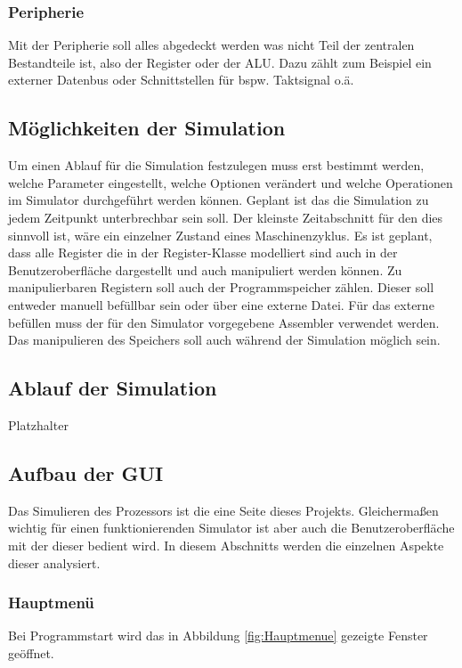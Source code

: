\documentclass[12pt]{article}
\newcommand{\imgSpaceBefore}{\vspace{10pt}}
\begin{document}
\subsubsection{Peripherie}
Mit der Peripherie soll alles abgedeckt werden was nicht Teil der zentralen Bestandteile ist, also der Register oder der ALU. Dazu zählt zum Beispiel ein externer Datenbus oder Schnittstellen für bspw. Taktsignal o.ä.

\subsection{Möglichkeiten der Simulation}
Um einen Ablauf für die Simulation festzulegen muss erst bestimmt werden, welche Parameter eingestellt, welche Optionen verändert und welche Operationen im Simulator durchgeführt werden können. Geplant ist das die Simulation zu jedem Zeitpunkt unterbrechbar sein soll. Der kleinste Zeitabschnitt für den dies sinnvoll ist, wäre ein einzelner Zustand eines Maschinenzyklus. Es ist geplant, dass alle Register die in der Register-Klasse modelliert sind auch in der Benutzeroberfläche dargestellt und auch manipuliert werden können. Zu manipulierbaren Registern soll auch der Programmspeicher zählen. Dieser soll entweder manuell befüllbar sein oder über eine externe Datei. Für das externe befüllen muss der für den Simulator vorgegebene Assembler verwendet werden. Das manipulieren des Speichers soll auch während der Simulation möglich sein.

\subsection{Ablauf der Simulation}
Platzhalter

\subsection{Aufbau der GUI}
\label{chp:AufbauGUI}
Das Simulieren des Prozessors ist die eine Seite dieses Projekts. Gleichermaßen wichtig für einen funktionierenden Simulator ist aber auch die Benutzeroberfläche mit der dieser bedient wird. In diesem Abschnitts werden die einzelnen Aspekte dieser analysiert.
\subsubsection{Hauptmenü}
Bei Programmstart wird das in Abbildung \ref{fig:Hauptmenue} gezeigte Fenster geöffnet.\imgSpaceBefore
\end{document}
